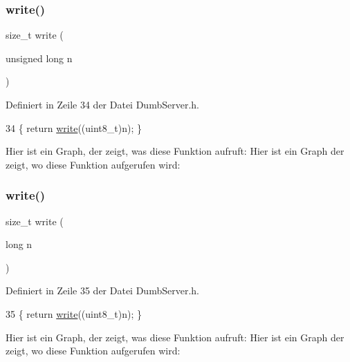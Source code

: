 \subsubsection{\texorpdfstring{write()}{write()}\hspace{0.1cm}{\footnotesize\ttfamily [3/6]}}
{\footnotesize\ttfamily size\+\_\+t write (\begin{DoxyParamCaption}\item[{unsigned long}]{n }\end{DoxyParamCaption})\hspace{0.3cm}{\ttfamily [inline]}}



Definiert in Zeile 34 der Datei Dumb\+Server.\+h.


\begin{DoxyCode}
34 \{ \textcolor{keywordflow}{return} \hyperlink{classEspServer_a7c66fc8d559f4956d4ccea196299bca7}{write}((uint8\_t)n); \}
\end{DoxyCode}
Hier ist ein Graph, der zeigt, was diese Funktion aufruft\+:
Hier ist ein Graph der zeigt, wo diese Funktion aufgerufen wird\+:
\mbox{\label{classEspServer_a3cfec102ee6f58a2f7e617999ce9f5bb}} 
\subsubsection{\texorpdfstring{write()}{write()}\hspace{0.1cm}{\footnotesize\ttfamily [4/6]}}
{\footnotesize\ttfamily size\+\_\+t write (\begin{DoxyParamCaption}\item[{long}]{n }\end{DoxyParamCaption})\hspace{0.3cm}{\ttfamily [inline]}}



Definiert in Zeile 35 der Datei Dumb\+Server.\+h.


\begin{DoxyCode}
35 \{ \textcolor{keywordflow}{return} \hyperlink{classEspServer_a7c66fc8d559f4956d4ccea196299bca7}{write}((uint8\_t)n); \}
\end{DoxyCode}
Hier ist ein Graph, der zeigt, was diese Funktion aufruft\+:
Hier ist ein Graph der zeigt, wo diese Funktion aufgerufen wird\+:
\mbox{\label{classEspServer_a2d9bc6ac05e45a7023be3cd1ca224407}} 

